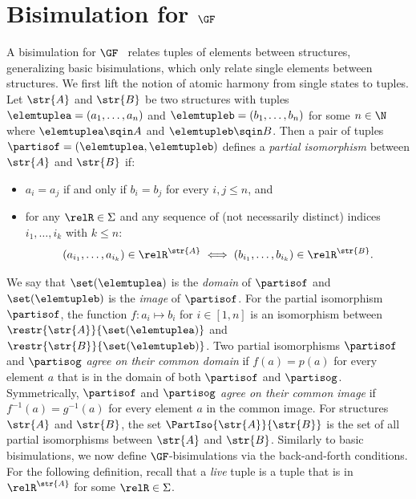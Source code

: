 \section{Bisimulation for $\GF$}
A bisimulation for $\GF$~\cite{AndrekaNB98} relates tuples of elements between structures, generalizing basic bisimulations, which only relate single elements between structures.
We first lift the notion of atomic harmony from single states to tuples.
Let $\str{A}$ and $\str{B}$ be two structures with tuples $\elemtuplea = (a_{1}, \ldots, a_{n})$ and $\elemtupleb = (b_{1}, \ldots, b_{n})$ for some $n \in \N$ where $\elemtuplea \sqin A$ and $\elemtupleb \sqin B$.
Then a pair of tuples $\partisof = (\elemtuplea, \elemtupleb)$ defines a \emph{partial isomorphism} between $\str{A}$ and $\str{B}$ if:
\begin{itemize}
  \item $a_{i} = a_{j}$ if and only if $b_{i} = b_{j}$ for every $i,j \le n$, and
  \item for any $\relR \in \Sigma$ and any sequence of (not necessarily distinct) indices $i_{1}, \ldots, i_{k}$ with $k \le n$:
    \begin{equation*}
    (a_{i_{1}}, \ldots, a_{i_{k}}) \in \relR^{\str{A}} \iff (b_{i_{1}}, \ldots, b_{i_{k}}) \in \relR^{\str{B}}\mathrm{.}
    \end{equation*}
\end{itemize}
We say that $\set(\elemtuplea)$ is the \emph{domain} of $\partisof$ and $\set(\elemtupleb)$ is the \emph{image} of $\partisof$.
For the partial isomorphism $\partisof$, the function $f \colon a_{i} \mapsto b_{i}$ for $i \in [1,n]$ is an isomorphism between $\restr{\str{A}}{\set(\elemtuplea)}$ and $\restr{\str{B}}{\set(\elemtupleb)}$.
Two partial isomorphisms $\partisof$ and $\partisog$ \emph{agree on their common domain} if $f(a) = p(a)$ for every element $a$ that is in the domain of both $\partisof$ and $\partisog$.
Symmetrically, $\partisof$ and $\partisog$ \emph{agree on their common image} if $f^{-1}(a) = g^{-1}(a)$ for every element $a$ in the common image.
For structures $\str{A}$ and $\str{B}$, the set $\PartIso{\str{A}}{\str{B}}$ is the set of all partial isomorphisms between $\str{A}$ and $\str{B}$. Similarly to basic bisimulations, we now define $\GF$-bisimulations via the back-and-forth conditions. For the following definition, recall that a \emph{live} tuple is a tuple that is in $\relR^{\str{A}}$ for some $\relR \in \Sigma$.
